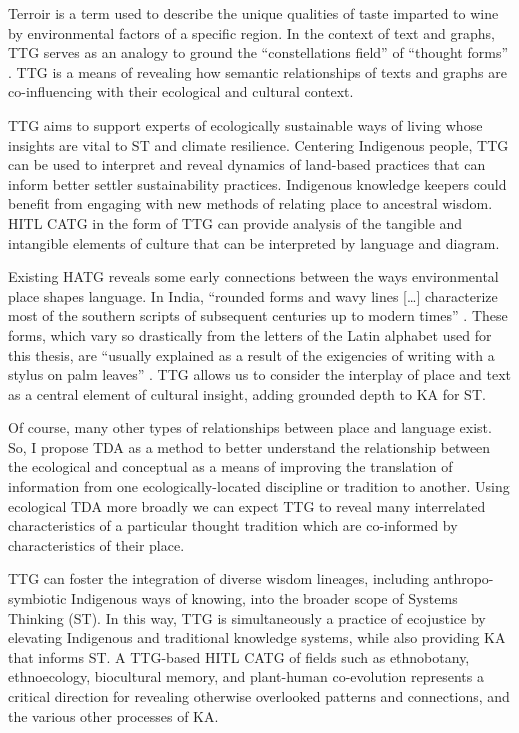 \vspace{1em}


Terroir is a term used to describe the unique qualities of taste imparted to wine by environmental factors of a specific region. In the context of text and graphs, TTG serves as an analogy \citep[p. 20, 28]{sowa_challenge_2004} to ground the “constellations field” of “thought forms” \citep[p. 196]{drucker_graphesis_2014}. TTG is a means of revealing how semantic relationships of texts and graphs are co-influencing with their ecological and cultural context. 

TTG aims to support experts of ecologically sustainable ways of living whose insights are vital to ST and climate resilience. Centering Indigenous people, TTG can be used to interpret and reveal dynamics of land-based practices that can inform better settler sustainability practices. Indigenous knowledge keepers could benefit from engaging with new methods of relating place to ancestral wisdom. HITL CATG in the form of TTG can provide analysis of the tangible and intangible elements of culture that can be interpreted by language and diagram. 

Existing HATG reveals some early connections between the ways environmental place shapes language. In India, “rounded forms and wavy lines […] characterize most of the southern scripts of subsequent centuries up to modern times” \citep[p. 39]{salomon_indian_1998}. These forms, which vary so drastically from the letters of the Latin alphabet used for this thesis, are “usually explained as a result of the exigencies of writing with a stylus on palm leaves” \citep[p. 39]{salomon_indian_1998}. TTG allows us to consider the interplay of place and text as a central element of cultural insight, adding grounded depth to KA for ST.

Of course, many other types of relationships between place and language exist. So, I propose TDA as a method to better understand the relationship between the ecological and conceptual as a means of improving the translation of information from one ecologically-located discipline or tradition to another.  Using ecological TDA more broadly we can expect TTG to reveal many interrelated characteristics of a particular thought tradition which are co-informed by characteristics of their place.

TTG can foster the integration of diverse wisdom lineages, including anthropo-symbiotic\citep{fonseca_anthropo-symbiotic_2022} Indigenous ways of knowing, into the broader scope of Systems Thinking (ST). In this way, TTG is simultaneously a practice of ecojustice by elevating Indigenous and traditional knowledge systems, while also providing KA that informs ST. A TTG-based HITL CATG of fields such as ethnobotany, ethnoecology, biocultural memory, and plant-human co-evolution represents a critical direction for revealing otherwise overlooked patterns and connections, and the various other processes of KA.

